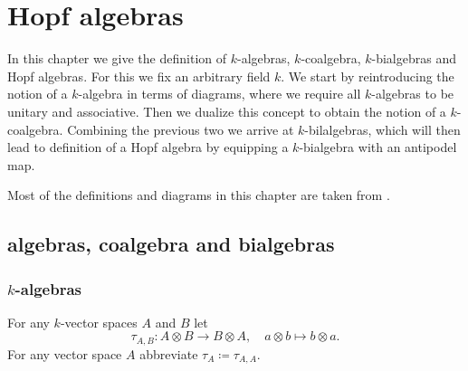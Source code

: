\chapter{Hopf algebras}
In this chapter we give the definition of $k$-algebras, $k$-coalgebra, $k$-bialgebras and Hopf algebras. For this we fix an arbitrary field $k$. We start by reintroducing the notion of a $k$-algebra in terms of diagrams, where we require all $k$-algebras to be unitary and associative. Then we dualize this concept to obtain the notion of a $k$-coalgebra. Combining the previous two we arrive at $k$-bilalgebras, which will then lead to definition of a Hopf algebra by equipping a $k$-bialgebra with an antipodel map.

Most of the definitions and diagrams in this chapter are taken from \cite{Brown}.





\section{algebras, coalgebra and bialgebras}



\subsection{\texorpdfstring{$k$}{k}-algebras}


\begin{defi}
 For any $k$-vector spaces $A$ and $B$ let
 \[
  \tau_{A,B} \colon A \otimes B \to B \otimes A, \quad a \otimes b \mapsto b \otimes a.
 \]
 For any vector space $A$ abbreviate $\tau_A \coloneqq \tau_{A,A}$.
\end{defi}


